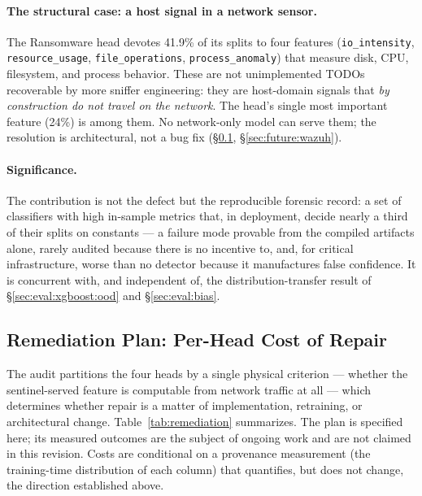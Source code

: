 \paragraph{The structural case: a host signal in a network sensor.}
The Ransomware head devotes 41.9\% of its splits to four features
(\texttt{io\_intensity}, \texttt{resource\_usage}, \texttt{file\_operations},
\texttt{process\_anomaly}) that measure disk, CPU, filesystem, and process
behavior. These are not unimplemented TODOs recoverable by more sniffer
engineering: they are host-domain signals that \emph{by construction do not
travel on the network}. The head's single most important feature (24\%) is among
them. No network-only model can serve them; the resolution is architectural, not
a bug fix (\S\ref{sec:eval:remediation}, \S\ref{sec:future:wazuh}).

\paragraph{Significance.}
The contribution is not the defect but the reproducible forensic record: a set of
classifiers with high in-sample metrics that, in deployment, decide nearly a third
of their splits on constants --- a failure mode provable from the compiled
artifacts alone, rarely audited because there is no incentive to, and, for
critical infrastructure, worse than no detector because it manufactures false
confidence. It is concurrent with, and independent of, the distribution-transfer
result of \S\ref{sec:eval:xgboost:ood} and \S\ref{sec:eval:bias}.



\subsection{Remediation Plan: Per-Head Cost of Repair}
\label{sec:eval:remediation}

The audit partitions the four heads by a single physical criterion --- whether
the sentinel-served feature is computable from network traffic at all --- which
determines whether repair is a matter of implementation, retraining, or
architectural change. Table~\ref{tab:remediation} summarizes. The plan is
specified here; its measured outcomes are the subject of ongoing work and are not
claimed in this revision. Costs are conditional on a provenance measurement (the
training-time distribution of each column) that quantifies, but does not change,
the direction established above.


